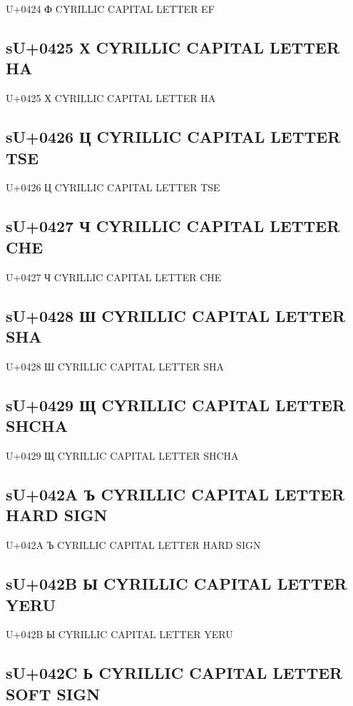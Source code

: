 U+0424 Ф  CYRILLIC CAPITAL LETTER EF

\subsection{sU+0425 Х  CYRILLIC CAPITAL LETTER HA}

U+0425 Х  CYRILLIC CAPITAL LETTER HA

\subsection{sU+0426 Ц  CYRILLIC CAPITAL LETTER TSE}

U+0426 Ц  CYRILLIC CAPITAL LETTER TSE

\subsection{sU+0427 Ч  CYRILLIC CAPITAL LETTER CHE}

U+0427 Ч  CYRILLIC CAPITAL LETTER CHE

\subsection{sU+0428 Ш  CYRILLIC CAPITAL LETTER SHA}

U+0428 Ш  CYRILLIC CAPITAL LETTER SHA

\subsection{sU+0429 Щ  CYRILLIC CAPITAL LETTER SHCHA}

U+0429 Щ  CYRILLIC CAPITAL LETTER SHCHA

\subsection{sU+042A Ъ  CYRILLIC CAPITAL LETTER HARD SIGN}

U+042A Ъ  CYRILLIC CAPITAL LETTER HARD SIGN

\subsection{sU+042B Ы  CYRILLIC CAPITAL LETTER YERU}

U+042B Ы  CYRILLIC CAPITAL LETTER YERU

\subsection{sU+042C Ь  CYRILLIC CAPITAL LETTER SOFT SIGN}

